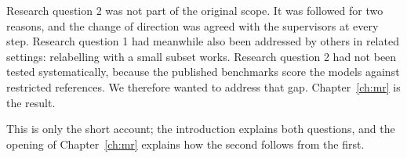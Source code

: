 Research question 2 was not part of the original scope. It was
followed for two reasons, and the change of direction was agreed with
the supervisors at every step. Research question 1 had meanwhile also
been addressed by others in related settings: relabelling with a small subset works.
Research question 2 had not been tested systematically, because the
published benchmarks score the models against restricted references.
We therefore wanted to address that gap. Chapter~\ref{ch:mr} is the
result.

This is only the short account; the introduction explains both
questions, and the opening of Chapter~\ref{ch:mr} explains how the
second follows from the first.
